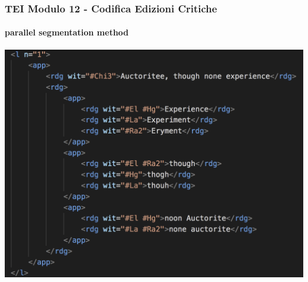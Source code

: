 \begin{frame}
    \frametitle{TEI Modulo 12 - Codifica Edizioni Critiche}
    \framesubtitle{parallel segmentation method}
    \addtocounter{nframe}{1}




   
    \begin{center}
       \includegraphics[width=.95\textwidth]{imgs/parallel-segmentation-nested.png}
    \end{center}

\end{frame}


